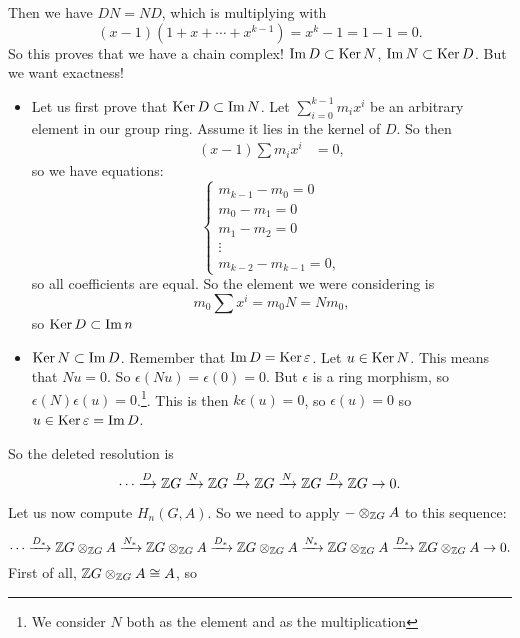 Then we have
$ DN = ND $, which is multiplying with
\[
    (x-1)(1 + x + \cdots + x^{k-1}) = x^{k} - 1 = 1 - 1 = 0
.\] 
So this proves that we have a chain complex! $\operatorname{Im} D \subset \operatorname{Ker} N$, $\operatorname{Im} N \subset  \operatorname{Ker} D$.
But we want exactness!
\begin{itemize}
    \item Let us first prove that $\operatorname{Ker} D \subset  \operatorname{Im} N$.
        Let $\sum_{i=0}^{k-1} m_i x^{i}$ be an arbitrary element in our group ring.
        Assume it lies in the kernel of $D$.
        So then
        \begin{align*}
            (x-1)\sum m_i x^{i} &= 0
        ,\end{align*} 
        so we have equations:
        \[
            \begin{cases}
                m_{k-1} - m_0 = 0\\
                m_{0} - m_1 = 0\\
                m_{1} - m_2 = 0\\
                \vdots\\
                m_{k-2}-m_{k-1} = 0,
            \end{cases}
        \] 
        so all coefficients are equal.
        So the element we were considering is 
        \[
            m_0 \sum x^{i} = m_0 N  = N m_0
        ,\] 
        so $\operatorname{Ker} D \subset \operatorname{Im} n$
    \item $\operatorname{Ker} N \subset \operatorname{Im} D$.
        Remember that $\operatorname{Im} D =\operatorname{Ker} \varepsilon$.
        Let  $u \in  \operatorname{Ker} N$.
        This means that $N u = 0$.
        So $\epsilon(Nu) = \epsilon(0) = 0$.
        But $\epsilon$ is a ring morphism, so  $\epsilon(N) \epsilon(u) = 0$.\footnote{We consider  $N$ both as the element and as the multiplication}. This is then  $k \epsilon(u) = 0$, so  $\epsilon(u) = 0$ so  $u \in \operatorname{Ker} \varepsilon  = \operatorname{Im} D$.


\end{itemize}

So the deleted resolution is
\[
    \cdots \xrightarrow{D}  \mathbb{Z} G \xrightarrow{N} \mathbb{Z} G
    \xrightarrow{D}  \mathbb{Z} G \xrightarrow{N} \mathbb{Z} G
    \xrightarrow{D}  \mathbb{Z} G  \to  0
.\] 

\hr

Let us now compute $H_n(G, A)$. 
So we need to apply $-\otimes_{\mathbb{Z} G} A$ to this sequence:

\[
    \cdots
    \xrightarrow{D_*}  \mathbb{Z} G \otimes_{\mathbb{Z} G} A
    \xrightarrow{N_*} \mathbb{Z} G \otimes_{\mathbb{Z} G} A
    \xrightarrow{D_*} \mathbb{Z} G \otimes_{\mathbb{Z} G} A
    \xrightarrow{N_*} \mathbb{Z} G \otimes_{\mathbb{Z} G} A
    \xrightarrow{D_*} \mathbb{Z} G \otimes_{\mathbb{Z} G} A  \to  0
.\] 
First of all, $\mathbb{Z} G \otimes_{\mathbb{Z} G} A \cong A$, so

